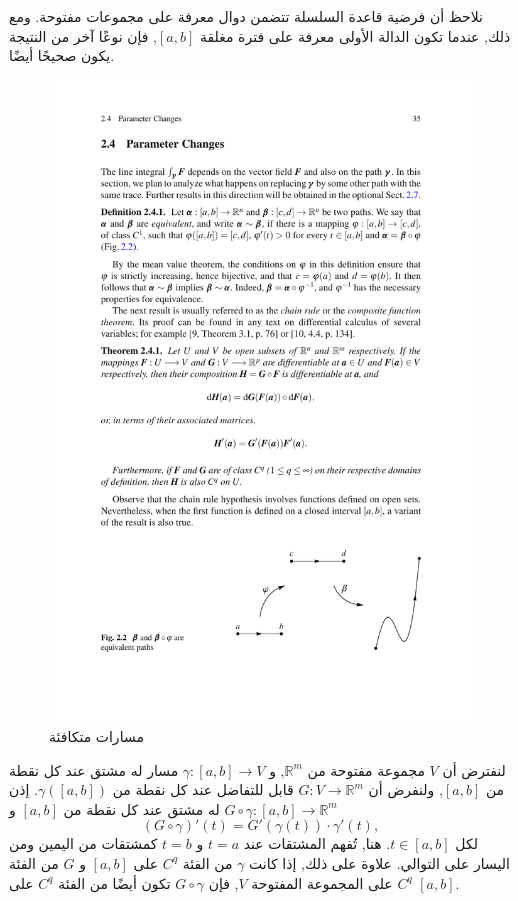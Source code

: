 نلاحظ أن فرضية قاعدة السلسلة تتضمن دوال معرفة على مجموعات مفتوحة. ومع ذلك, عندما تكون الدالة الأولى معرفة على فترة مغلقة $[a, b]$, فإن نوعًا آخر من النتيجة يكون صحيحًا أيضًا.

\begin{figure}
    \centering
    \includegraphics[width=0.75\linewidth]{equivalent path.pdf}
    \caption{مسارات متكافئة}
    \label{fig:enter-label}
\end{figure}

\begin{lemma}
لنفترض أن \( V \) مجموعة مفتوحة من \( \mathbb{R}^m \), و \( \gamma : [a, b] \to V \) مسار له مشتق عند كل نقطة من $[a, b]$, ولنفرض أن \( G : V \to \mathbb{R}^m \) قابل للتفاضل عند كل نقطة من \( \gamma([a, b]) \). إذن \( G \circ \gamma : [a, b] \to \mathbb{R}^m \) له مشتق عند كل نقطة من $[a, b]$ و
\[ (G \circ \gamma)'(t) = G'(\gamma(t)) \cdot \gamma'(t), \]
لكل \( t \in [a, b] \). هنا, تُفهم المشتقات عند \( t = a \) و \( t = b \) كمشتقات من اليمين ومن اليسار على التوالي. علاوة على ذلك, إذا كانت \( \gamma \) من الفئة \( C^q \) على $[a, b]$ و \( G \) من الفئة \( C^q \) على المجموعة المفتوحة \( V \), فإن \( G \circ \gamma \) تكون أيضًا من الفئة \( C^q \) على $[a, b]$.
\end{lemma}

